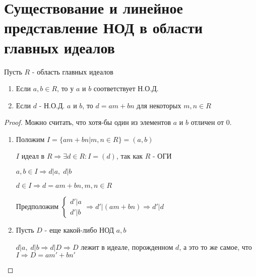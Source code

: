 \section{Существование и линейное представление НОД в области главных идеалов}
\begin{normalsize}
\begin{theorem-non}
    Пусть $R$ - область главных идеалов 

    \begin{enumerate}
        \item Если $a, b \in R$, то у $a$ и $b$ соответствует Н.О.Д.
        \item Если $d$ - Н.О.Д. $a$ и $b$, то $d = am + bn$ для некоторых $m, n \in R$
    \end{enumerate}
    \begin{proof}
        Можно считать, что хотя-бы один из элементов $a$ и $b$ отличен от $0$.
        \begin{enumerate}
            \item Положим $I = \{am + bn | m, n \in R\} = (a, b)$
            
            $I$ идеал в $R \Longrightarrow \exists d \in R : I = (d)$, так как $R$ - ОГИ  

            $a, b \in I \Longrightarrow d | a, \; d | b$

            $d \in I \Longrightarrow d = am + bn, m,n \in R$

            Предположим $\begin{cases}
                d' | a \\
                d' | b
            \end{cases} \Longrightarrow d' | (am + bn) \Longrightarrow d' | d$

            \item Пусть $D$ - еще какой-либо НОД $a, b$ 

            $d | a, \; d|b \Longrightarrow d | D \Longrightarrow D$ лежит в идеале, порожденном $d$, а это то же самое, что $I \Longrightarrow D = am' + bn'$ 
        \end{enumerate}
    \end{proof}
\end{theorem-non}
\end{normalsize}